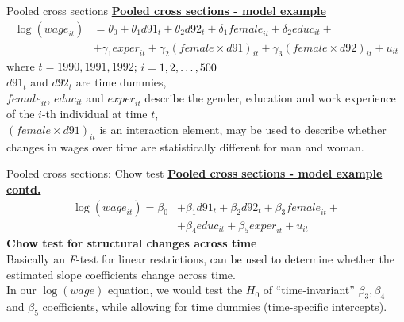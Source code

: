 \documentclass[usenames,dvipsnames]{beamer}
\newcommand{\mytikzmark}[2]{%
  \tikz[remember picture,inner sep=0pt,outer sep=0pt,baseline,anchor=base] 
    \node (#1) {\ensuremath{#2}};}
\begin{document}
\begin{frame}{Pooled cross sections}
\underline{\textbf{Pooled cross sections - model example}}
\begin{align*}
\log(\textit{wage}_{it}) & = \theta_0 + \theta_1 d91_t + \theta_2 d92_t + \delta_1 \textit{female}_{it} + \delta_2 \textit{educ}_{it} +\\
& + \gamma_1 \textit{exper}_{it} + \gamma_2 (\textit{female} \times d91)_{it} + \gamma_3 (\textit{female} \times d92)_{it} + u_{it} 
\end{align*}
\medskip
where $t = 1990, 1991, 1992$; \hspace{0.2cm} $i=1,2, \dots , \mytikzmark{500}{500}$ \\
$d91_{t}$ and $d92_t$ are time dummies, \\
\vspace{0.2cm}
$\textit{female}_{it}$, $\textit{educ}_{it}$ and $\textit{exper}_{it}$ describe the gender, education and work experience of the $i$-th individual at time $t$, \\
\vspace{0.2cm}
$(\textit{female} \times d91)_{it}$ is an interaction element, may be used to describe whether changes in wages over time are statistically different for man and woman.
\end{frame}
\begin{frame}{Pooled cross sections: Chow test}
\underline{\textbf{Pooled cross sections - model example contd.}}
\begin{align*}
 \log(\textit{wage}_{it}) =  \beta_0 & + \beta_1 d91_t + \beta_2 d92_t + \beta_3 \textit{female}_{it} + \\
 & + \beta_4 \textit{educ}_{it} + \beta_5 \textit{exper}_{it} + u_{it}
\end{align*}
\textbf{Chow test for structural changes across time} \\
\smallskip
Basically an \textit{F}-test for linear restrictions, can be used to determine whether the estimated slope coefficients change across time.\\
\medskip
In our $\log(wage)$ equation, we would test the $H_0$ of ``time-invariant'' $\beta_3, \beta_4$ and $\beta_5$ coefficients, while allowing for time dummies (time-specific intercepts).
\end{frame}
\end{document}
